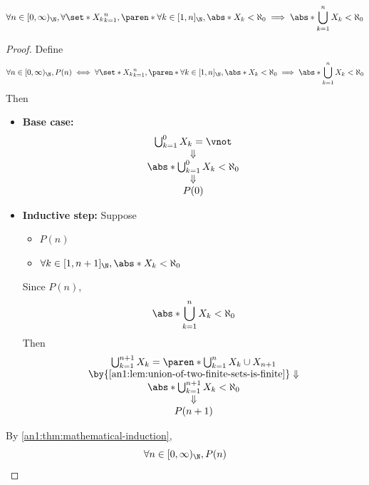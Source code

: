 \begin{theorem} \label{an1:thm:finite-union-of-finite-sets-is-finite}
  \[
    \forall n \in [0, \infty)_{\N}, \forall \set*{X_{k}}_{k = 1}^{n},
    \paren*{\forall k \in [1, n]_{\N}, \abs*{X_{k}} < \aleph_{0}}
    \implies \abs*{\bigcup_{k = 1}^{n} X_{k}} < \aleph_{0}
  \]
\end{theorem}

\begin{proof}
  Define
  \[
    \forall n \in [0, \infty)_{\N}, P(n) \iff \forall \set*{X_{k}}_{k = 1}^{n}, \paren*{\forall k \in [1, n]_{\N},
      \abs*{X_{k}} < \aleph_{0}} \implies \abs*{\bigcup_{k = 1}^{n} X_{k}} < \aleph_{0}
  \]
  Then
  \begin{itemize}
    \item \textbf{Base case:}
          \[
            \begin{array}{c}
              \bigcup_{k = 1}^{0} X_{k} = \vnot             \\
              \Downarrow                                    \\
              \abs*{\bigcup_{k = 1}^{0} X_{k}} < \aleph_{0} \\
              \Downarrow                                    \\
              P(0)
            \end{array}
          \]
    \item \textbf{Inductive step:} Suppose
          \begin{itemize}
            \item $P(n)$
            \item $\forall k \in [1, n + 1]_{\N}, \abs*{X_{k}} < \aleph_{0}$
          \end{itemize}
          Since $P(n)$,
          \[
            \abs*{\bigcup_{k = 1}^{n} X_{k}} < \aleph_{0}
          \]
          Then
          \[
            \begin{array}{c}
              \bigcup_{k = 1}^{n + 1} X_{k} = \paren*{\bigcup_{k = 1}^{n} X_{k}} \cup X_{n + 1} \\
              \by{\Cref{an1:lem:union-of-two-finite-sets-is-finite}} \Downarrow                 \\
              \abs*{\bigcup_{k = 1}^{n + 1} X_{k}} < \aleph_{0}                                 \\
              \Downarrow                                                                        \\
              P(n + 1)
            \end{array}
          \]
  \end{itemize}
  By \cref{an1:thm:mathematical-induction},
  \[
    \forall n \in [0, \infty)_{\N}, P(n)
  \]
\end{proof}

